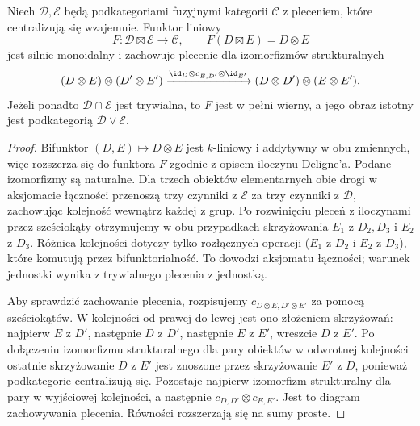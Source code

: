 \begin{stwierdzenie}\label{cat:prop:tf-centralizing-product}
Niech $\mathcal D,\mathcal E$ będą podkategoriami fuzyjnymi kategorii $\mathcal C$ z pleceniem, które centralizują się wzajemnie. Funktor liniowy
\[
 F:\mathcal D\boxtimes\mathcal E\to\mathcal C,\qquad
 F(D\boxtimes E)=D\otimes E
\]
jest silnie monoidalny i zachowuje plecenie dla izomorfizmów strukturalnych
\[
 (D\otimes E)\otimes(D'\otimes E')
 \xrightarrow{\id_D\otimes c_{E,D'}\otimes\id_{E'}}
 (D\otimes D')\otimes(E\otimes E').
\]
Jeżeli ponadto $\mathcal D\cap\mathcal E$ jest trywialna, to $F$ jest w pełni wierny, a jego obraz istotny jest podkategorią $\mathcal D\vee\mathcal E$.
\end{stwierdzenie}
\begin{proof}
Bifunktor $(D,E)\mapsto D\otimes E$ jest $k$-liniowy i addytywny w obu zmiennych, więc rozszerza się do funktora $F$ zgodnie z opisem iloczynu Deligne'a. Podane izomorfizmy są naturalne. Dla trzech obiektów elementarnych obie drogi w aksjomacie łączności przenoszą trzy czynniki z $\mathcal E$ za trzy czynniki z $\mathcal D$, zachowując kolejność wewnątrz każdej z grup. Po rozwinięciu pleceń z iloczynami przez sześciokąty otrzymujemy w obu przypadkach skrzyżowania $E_1$ z $D_2,D_3$ i $E_2$ z $D_3$. Różnica kolejności dotyczy tylko rozłącznych operacji ($E_1$ z $D_2$ i $E_2$ z $D_3$), które komutują przez bifunktorialność. To dowodzi aksjomatu łączności; warunek jednostki wynika z trywialnego plecenia z jednostką.

Aby sprawdzić zachowanie plecenia, rozpisujemy $c_{D\otimes E,D'\otimes E'}$ za pomocą sześciokątów. W kolejności od prawej do lewej jest ono złożeniem skrzyżowań: najpierw $E$ z $D'$, następnie $D$ z $D'$, następnie $E$ z $E'$, wreszcie $D$ z $E'$. Po dołączeniu izomorfizmu strukturalnego dla pary obiektów w odwrotnej kolejności ostatnie skrzyżowanie $D$ z $E'$ jest znoszone przez skrzyżowanie $E'$ z $D$, ponieważ podkategorie centralizują się. Pozostaje najpierw izomorfizm strukturalny dla pary w wyjściowej kolejności, a następnie $c_{D,D'}\otimes c_{E,E'}$. Jest to diagram zachowywania plecenia. Równości rozszerzają się na sumy proste.


\end{proof}
